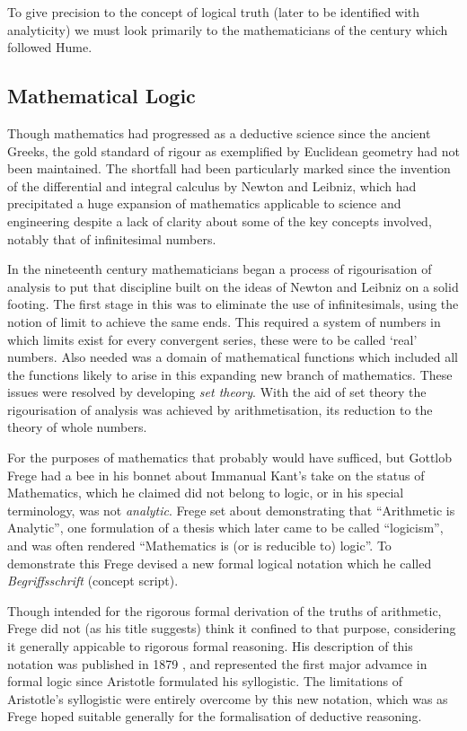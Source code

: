 \documentclass[10pt,titlepage]{book}
\begin{document}
To give precision to the concept of logical truth (later to be identified with analyticity)  we must look primarily to the mathematicians of the century which followed Hume.

\subsection{Mathematical Logic}

Though mathematics had progressed as a deductive science since the ancient Greeks, the gold standard of rigour as exemplified by Euclidean geometry had not been maintained.
The shortfall had been particularly marked since the invention of the differential and integral calculus by Newton and Leibniz, which had precipitated a huge expansion of mathematics applicable to science and engineering despite a lack of clarity about some of the key concepts involved, notably that of infinitesimal numbers.

In the nineteenth century mathematicians began a process of rigourisation of analysis to put that discipline built on the ideas of Newton and Leibniz on a solid footing.
The first stage in this was to eliminate the use of infinitesimals, using the notion of limit to achieve the same ends.
This required a system of numbers in which limits exist for every convergent series, these were to be called `real' numbers.
Also needed was a domain of mathematical functions which included all the functions likely to arise in this expanding new branch of mathematics.
These issues were resolved by developing \emph{set theory}.
With the aid of set theory the rigourisation of analysis was achieved by arithmetisation, its reduction to the theory of whole numbers.

For the purposes of mathematics that probably would have sufficed, but Gottlob Frege had a bee in his bonnet about Immanual Kant's take on the status of Mathematics, which he claimed did not belong to logic, or in his special terminology, was not \emph{analytic}.
Frege set about demonstrating that ``Arithmetic is Analytic'', one formulation of a thesis which later came to be called ``logicism'', and was often rendered ``Mathematics is (or is reducible to) logic''.
To demonstrate this Frege devised a new formal logical notation which he called \emph{Begriffsschrift} (concept script).

Though intended for the rigorous formal derivation of the truths of arithmetic, Frege did not (as his title suggests) think it confined to that purpose, considering it generally appicable to rigorous formal reasoning.
His description of this notation was published in 1879 \cite{frege1879}, and represented the first major advamce in formal logic since Aristotle formulated his syllogistic.
The limitations of Aristotle's syllogistic were entirely overcome by this new notation, which was as Frege hoped suitable generally for the formalisation of deductive reasoning.
\end{document}
